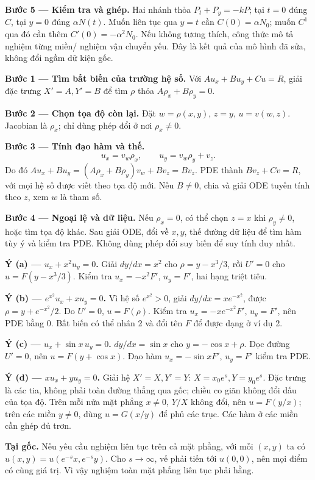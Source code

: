 \textbf{Bước 5 — Kiểm tra và ghép.} Hai nhánh thỏa $P_t+P_y=-kP$; tại $t=0$ đúng $C$, tại $y=0$ đúng $\alpha N(t)$. Muốn liên tục qua $y=t$ cần $C(0)=\alpha N_0$; muốn $C^1$ qua đó cần thêm $C'(0)=-\alpha^2N_0$. Nếu không tương thích, công thức mô tả nghiệm từng miền/ nghiệm vận chuyển yếu. Đây là kết quả của mô hình đã sửa, không đổi ngầm dữ kiện gốc.

\textbf{Bước 1 — Tìm bất biến của trường hệ số.} Với $Au_x+Bu_y+Cu=R$, giải đặc trưng $X'=A,Y'=B$ để tìm $\rho$ thỏa $A\rho_x+B\rho_y=0$.

\textbf{Bước 2 — Chọn tọa độ còn lại.} Đặt $w=\rho(x,y)$, $z=y$, $u=v(w,z)$. Jacobian là $\rho_x$; chỉ dùng phép đổi ở nơi $\rho_x\ne0$.

\textbf{Bước 3 — Tính đạo hàm và thế.}
\[u_x=v_w\rho_x,\qquad u_y=v_w\rho_y+v_z.\]
Do đó $Au_x+Bu_y=(A\rho_x+B\rho_y)v_w+Bv_z=Bv_z$. PDE thành $Bv_z+Cv=R$, với mọi hệ số được viết theo tọa độ mới. Nếu $B\ne0$, chia và giải ODE tuyến tính theo $z$, xem $w$ là tham số.

\textbf{Bước 4 — Ngoại lệ và dữ liệu.} Nếu $\rho_x=0$, có thể chọn $z=x$ khi $\rho_y\ne0$, hoặc tìm tọa độ khác. Sau giải ODE, đổi về $x,y$, thế đường dữ liệu để tìm hàm tùy ý và kiểm tra PDE. Không dùng phép đổi suy biến để suy tính duy nhất.

\textbf{Ý (a) — $u_x+x^2u_y=0$.} Giải $dy/dx=x^2$ cho $\rho=y-x^3/3$, rồi $U'=0$ cho $u=F(y-x^3/3)$. Kiểm tra $u_x=-x^2F'$, $u_y=F'$, hai hạng triệt tiêu.

\textbf{Ý (b) — $e^{x^2}u_x+xu_y=0$.} Vì hệ số $e^{x^2}>0$, giải $dy/dx=xe^{-x^2}$, được $\rho=y+e^{-x^2}/2$. Do $U'=0$, $u=F(\rho)$. Kiểm tra $u_x=-xe^{-x^2}F'$, $u_y=F'$, nên PDE bằng 0. Bất biến có thể nhân 2 và đổi tên $F$ để được dạng ở ví dụ 2.

\textbf{Ý (c) — $u_x+\sin x\,u_y=0$.} $dy/dx=\sin x$ cho $y=-\cos x+\rho$. Dọc đường $U'=0$, nên $u=F(y+\cos x)$. Đạo hàm $u_x=-\sin x F'$, $u_y=F'$ kiểm tra PDE.

\textbf{Ý (d) — $xu_x+yu_y=0$.} Giải hệ $X'=X,Y'=Y$: $X=x_0e^s,Y=y_0e^s$. Đặc trưng là các tia, không phải toàn đường thẳng qua gốc; chiều co giãn không đổi dấu của tọa độ. Trên mỗi nửa mặt phẳng $x\ne0$, $Y/X$ không đổi, nên $u=F(y/x)$; trên các miền $y\ne0$, dùng $u=G(x/y)$ để phủ các trục. Các hàm ở các miền cần ghép đủ trơn.

\textbf{Tại gốc.} Nếu yêu cầu nghiệm liên tục trên cả mặt phẳng, với mỗi $(x,y)$ ta có $u(x,y)=u(e^{-s}x,e^{-s}y)$. Cho $s\to\infty$, vế phải tiến tới $u(0,0)$, nên mọi điểm có cùng giá trị. Vì vậy nghiệm toàn mặt phẳng liên tục phải hằng.

